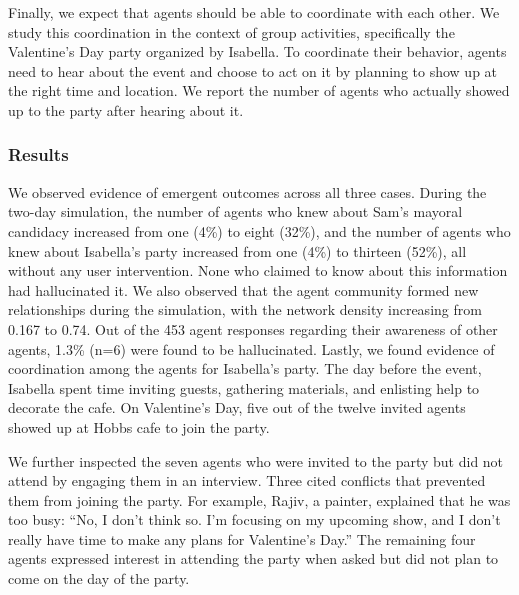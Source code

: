 Finally, we expect that agents should be able to coordinate with each other. We study this coordination in the context of group activities, specifically the Valentine's Day party organized by Isabella. To coordinate their behavior, agents need to hear about the event and choose to act on it by planning to show up at the right time and location. We report the number of agents who actually showed up to the party after hearing about it.

\subsubsection{Results}
We observed evidence of emergent outcomes across all three cases. During the two-day simulation, the number of agents who knew about Sam's mayoral candidacy increased from one (4\%) to eight (32\%), and the number of agents who knew about Isabella's party increased from one (4\%) to thirteen (52\%), all without any user intervention. None who claimed to know about this information had hallucinated it. We also observed that the agent community formed new relationships during the simulation, with the network density increasing from 0.167 to 0.74. Out of the 453 agent responses regarding their awareness of other agents, 1.3\% (n=6) were found to be hallucinated. Lastly, we found evidence of coordination among the agents for Isabella's party. The day before the event, Isabella spent time inviting guests, gathering materials, and enlisting help to decorate the cafe. On Valentine's Day, five out of the twelve invited agents showed up at Hobbs cafe to join the party. 

We further inspected the seven agents who were invited to the party but did not attend by engaging them in an interview. Three cited conflicts that prevented them from joining the party. For example, Rajiv, a painter, explained that he was too busy: {\color{darkgray}\small\fontfamily{}\selectfont
``No, I don't think so. I'm focusing on my upcoming show, and I don't really have time to make any plans for Valentine's Day.''} The remaining four agents expressed interest in attending the party when asked but did not plan to come on the day of the party.

